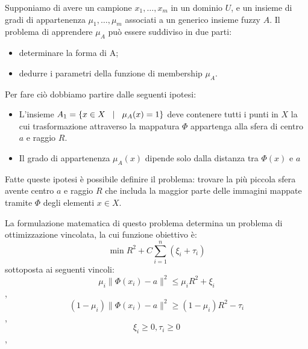 \documentclass[a4paper,12pt]{report}
\begin{document}
Supponiamo di avere un campione {$x_1,\dots,x_m$} in un dominio $U$, e un insieme di gradi di appartenenza {$\mu_1,\dots,\mu_m$} associati a un generico insieme fuzzy $A$. \newline
Il problema di apprendere $\mu_A$ può essere suddiviso in due parti:
\begin{itemize}
    \item determinare la forma di A;
    \item dedurre i parametri della funzione di membership $\mu_A$.
\end{itemize}
\noindent Per fare ciò dobbiamo partire dalle seguenti ipotesi:
\begin{itemize}
    \item L'insieme $A_1 = \{ x\in X \hspace{0,3cm} |\hspace{0,3cm} \mu_A(x) = 1 \}$ deve contenere tutti i punti in $X$ la cui trasformazione attraverso la mappatura $\Phi$ appartenga alla sfera di centro $a$ e raggio $R$.
    
    \item Il grado di appartenenza $\mu_A(x)$ dipende solo dalla distanza tra $\Phi(x)$ e $a$
\end{itemize}

\noindent Fatte queste ipotesi è possibile definire il problema: trovare la più piccola sfera avente centro $a$ e raggio $R$ che includa la maggior parte delle immagini mappate tramite $\Phi$ degli elementi $x\in X$.



La formulazione matematica di questo problema determina un problema di ottimizzazione vincolata, la cui funzione obiettivo è:
\begin{equation*}
    \min R^2 + C\displaystyle\sum_{i=1}^{n}(\xi_i+\tau_i)
    \label{eq:Probela_di_partenza}
\end{equation*}
sottoposta ai seguenti vincoli:
\begin{equation}
    \mu_i\|\Phi(x_i)-a\|^2\le\mu_iR^2 + \xi_i
    \label{eq:vincolo_1}
\end{equation},
\begin{equation}
    (1-\mu_i)\|\Phi(x_i)-a\|^2 \ge (1-\mu_i)R^2 - \tau_i
    \label{eq:vincolo_2}
\end{equation},
\begin{equation}
    \xi_i \ge 0, \tau_i \ge 0
    \label{eq:vincolo_3}
\end{equation},
\end{document}
